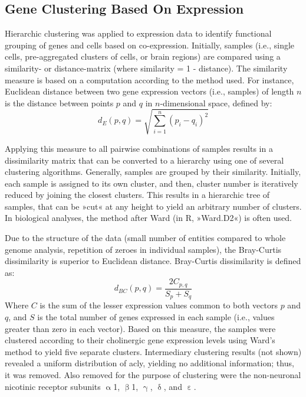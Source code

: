 \begin{method}

\section{Gene Clustering Based On Expression}

Hierarchic clustering was applied to expression data to identify functional grouping of genes and cells based on co-expression. Initially, samples (i.e., single cells, pre-aggregated clusters of cells, or brain regions) are compared using a similarity- or distance-matrix (where similarity = \num{1} - distance). The similarity measure is based on a computation according to the method used. For instance, Euclidean distance between two gene expression vectors (i.e., samples) of length $n$ is the distance between points $p$ and $q$ in $n$-dimensional space, defined by: $$d_E(p, q) = \sqrt{\sum_{i=1}^{n} (p_{i}-q_{i})^2}$$

Applying this measure to all pairwise combinations of samples results in a dissimilarity matrix that can be converted to a hierarchy using one of several clustering algorithms. Generally, samples are grouped by their similarity. Initially, each sample is assigned to its own cluster, and then, cluster number is iteratively reduced by joining the closest clusters. This results in a hierarchic tree of samples, that can be »cut« at any height to yield an arbitrary number of clusters. In biological analyses, the method after Ward (in R, »Ward.D2«) is often used\cite{Murtagh2014}.

Due to the structure of the data (small number of entities compared to whole genome analysis, repetition of zeroes in individual samples), the Bray-Curtis dissimilarity\cite{Bray1957} is superior to Euclidean distance. Bray-Curtis dissimilarity is defined as: $$d_{BC}(p, q) = \frac{2C_{p, q}}{S_p+S_q}$$ Where $C$ is the sum of the lesser expression values common to both vectors $p$ and $q$, and $S$ is the total number of genes expressed in each sample (i.e., values greater than zero in each vector). Based on this measure, the samples were clustered according to their cholinergic gene expression levels using Ward's method to yield five separate clusters. Intermediary clustering results (not shown) revealed a uniform distribution of \ac{acly}, yielding no additional information; thus, it was removed. Also removed for the purpose of clustering were the non-neuronal nicotinic receptor subunits $\upalpha$\num{1}, $\upbeta$\num{1}, $\upgamma$, $\updelta$, and $\upepsilon$. 

\end{method}

